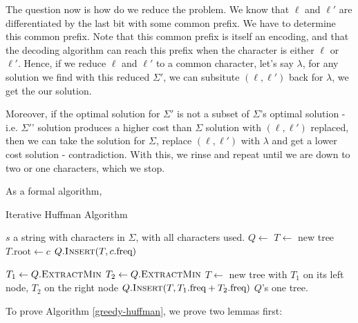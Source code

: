 The question now is how do we reduce the problem. We know that $\ell$ and $\ell'$ are differentiated by the last bit with some common prefix. 
We have to determine this common prefix. 
Note that this common prefix is itself an encoding, and that the decoding algorithm can reach this prefix when the character is either $\ell$ or $\ell'$. 
Hence, if we reduce $\ell$ and $\ell'$ to a common character, let's say $\lambda$, for any solution we find with this reduced $\Sigma'$, we can subsitute $(\ell, \ell')$ back for $\lambda$, we get the our solution.

Moreover, if the optimal solution for $\Sigma'$ is not a subset of $\Sigma$'s optimal solution - i.e. $\Sigma'$' solution produces a higher cost than $\Sigma$ solution with $(\ell, \ell')$ replaced, then we can take the solution for $\Sigma$, replace $(\ell, \ell')$ with $\lambda$ and get a lower cost solution - contradiction. With this, we rinse and repeat until we are down to two or one characters, which we stop. 

As a formal algorithm, 

\begin{algorithm}[H]
\caption{Iterative Huffman Algorithm}
\label{greedy-huffman}
\begin{algorithmic}[1]
    \Require $s$ a string with characters in $\Sigma$, with all characters used. 
        \State $Q \gets$ 
            \State $T \gets$ new tree
            \State $T.\text{root} \gets c$
            \State $Q.\Call{Insert}{T,c.\text{freq}}$
        \EndFor

            \State $T_1 \gets Q.\Call{ExtractMin}{}$ 
            \State $T_2 \gets Q.\Call{ExtractMin}{}$ 
            \State $T \gets$ new tree with $T_1$ on its left node, $T_2$ on the right node 
            \State $Q.\Call{Insert}{T,T_1.\text{freq}+T_2.\text{freq}}$ 
        \EndWhile
        \State \Return $Q$'s one tree. 
    \EndFunction
\end{algorithmic}
\end{algorithm}

To prove Algorithm \ref{greedy-huffman}, we prove two lemmas first:

